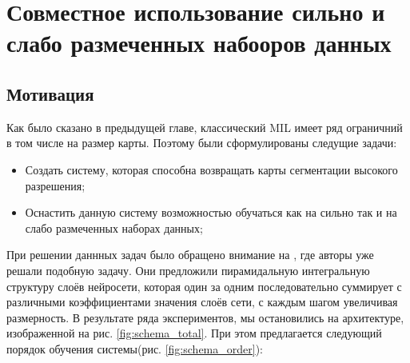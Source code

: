 \chapter{Совместное использование сильно и слабо размеченных набооров данных} \label{chapt3}

\section{Мотивация} \label{sect3_1}

Как было сказано в предыдущей главе, классический MIL имеет ряд ограничний в том числе на размер карты. Поэтому были сформулированы следущие задачи:

\begin{itemize}
    \item Создать систему, которая способна возвращать карты сегментации высокого разрешения;
    \item Оснастить данную систему возможностью обучаться как на сильно так и на слабо размеченных наборах данных;
\end{itemize}

При решении даннных задач было обращено внимание на \cite{rongchang_weakly-supervised_2018}, где авторы уже решали подобную задачу. Они предложили пирамидальную интегральную структуру слоёв нейросети, которая один за одним последовательно суммирует с различными коэффициентами значения слоёв сети, с каждым шагом увеличивая размерность. В результате ряда экспериментов, мы остановились на архитектуре, изображенной на рис. \ref{fig:schema_total}. При этом предлагается следующий порядок обучения системы(рис. \ref{fig:schema_order}):

